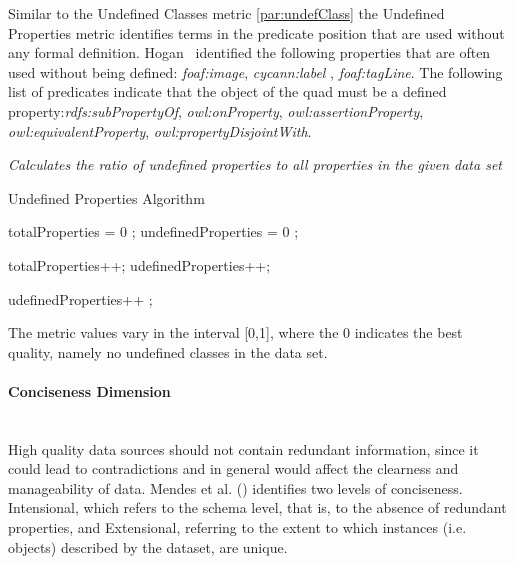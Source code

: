 {{Similar to the Undefined Classes metric \ref{par:undefClass} the Undefined Properties metric identifies terms in the predicate position that are used without any formal definition.
 Hogan~\cite{hogan2010} identified the following properties that are often used without being defined:  \textit{foaf:image}, \textit{cycann:label} , \textit{foaf:tagLine}.
The following list of predicates indicate that the object of the quad must be a defined property:\textit{rdfs:subPropertyOf}, \textit{owl:onProperty}, \textit{owl:assertionProperty}, \textit{owl:equivalentProperty}, \textit{owl:propertyDisjointWith}.

\begin{mdframed}[style=metricdefinition]
\emph{Calculates the ratio of undefined properties to all properties in the given data set}
\end{mdframed}

\begin{algorithm}
\caption{Undefined Properties Algorithm}
\begin{algorithmic}[1]
\State totalProperties = 0 ;
\State undefinedProperties = 0 ;
\EndProcedure

 totalProperties++; \EndIf 
{} udefinedProperties++; \EndIf

 udefinedProperties++ ; \EndIf
{}
\EndProcedure
\end{algorithmic}
\end{algorithm}

The metric values vary in the interval [0,1], where  the 0 indicates the best quality, namely no undefined classes in the data set.


\paragraph{Conciseness Dimension}~\\ %
High quality data sources should not contain redundant information, since it could lead to contradictions and in general would affect the clearness and manageability of data. Mendes et al. (\cite{Mendes2012}) identifies two levels of conciseness. Intensional, which refers to the schema level, that is, to the absence of redundant properties, and Extensional, referring to the extent to which instances (i.e. objects) described by the dataset, are unique.


}}

